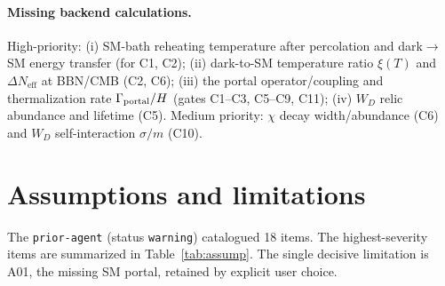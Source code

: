 \documentclass[11pt]{article}
\newcommand{\Neff}{N_{\mathrm{eff}}}
\begin{document}
\paragraph{Missing backend calculations.} High-priority: (i) SM-bath reheating temperature after
percolation and dark$\to$SM energy transfer (for C1, C2); (ii) dark-to-SM temperature ratio $\xi(T)$
and $\Delta\Neff$ at BBN/CMB (C2, C6); (iii) the portal operator/coupling and thermalization rate
$\Gamma_{\rm portal}/H$ (gates C1--C3, C5--C9, C11); (iv) $W_D$ relic abundance and lifetime (C5).
Medium priority: $\chi$ decay width/abundance (C6) and $W_D$ self-interaction $\sigma/m$ (C10).

\section{Assumptions and limitations}
\label{sec:assumptions}
The \texttt{prior-agent} (status \texttt{warning}) catalogued 18 items. The highest-severity items are
summarized in Table~\ref{tab:assump}. The single decisive limitation is A01, the missing SM portal,
retained by explicit user choice.
\end{document}
